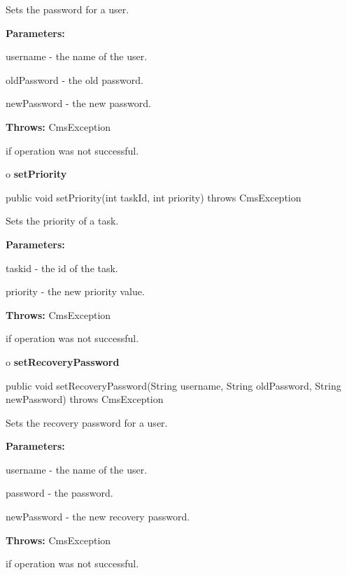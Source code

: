 \begin{description}
\htmlDD Sets the password for a user. 

\begin{description}
\item {\bf Parameters:}  

username - the name of the user.  

oldPassword - the old password.  

newPassword - the new password.  
\item {\bf Throws:} CmsException  

if operation was not successful.  
\end{description}

\end{description}

o {\bf setPriority} 

\begin{PRE}
 public void setPriority(int taskId,
                         int priority) throws CmsException
\end{PRE}

\begin{description}
\htmlDD Sets the priority of a task. 

\begin{description}
\item {\bf Parameters:}  

taskid - the id of the task.  

priority - the new priority value.  
\item {\bf Throws:} CmsException  

if operation was not successful.  
\end{description}

\end{description}

o {\bf setRecoveryPassword} 

\begin{PRE}
 public void setRecoveryPassword(String username,
                                 String oldPassword,
                                 String newPassword) throws CmsException
\end{PRE}

\begin{description}
\htmlDD Sets the recovery password for a user. 

\begin{description}
\item {\bf Parameters:}  

username - the name of the user.  

password - the password.  

newPassword - the new recovery password.  
\item {\bf Throws:} CmsException  

if operation was not successful.  
\end{description}

\end{description}

